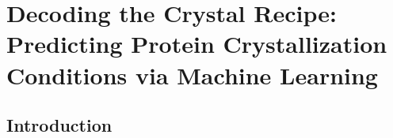 \chapter{Decoding the Crystal Recipe: Predicting Protein Crystallization Conditions via Machine Learning} %

\label{chapter:entry} 

\section{Introduction}\label{sec:introduction}